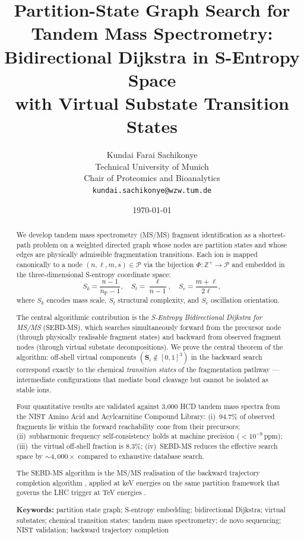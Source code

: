 \documentclass[twocolumn,10pt,a4paper]{article}
\title{\textbf{Partition-State Graph Search for Tandem Mass Spectrometry:\\
Bidirectional Dijkstra in S-Entropy Space\\
with Virtual Substate Transition States}}
\author{
Kundai Farai Sachikonye\\
Technical University of Munich\\
Chair of Proteomics and Bioanalytics\\
\texttt{kundai.sachikonye@wzw.tum.de}
}
\date{\today}
\theoremstyle{thmstyle}
\theoremstyle{definition}
\theoremstyle{remark}
\newcommand{\Zp}{\mathbb{Z}^{+}}
\newcommand{\nP}{n_{\mathrm{P}}}
\newcommand{\Parts}{\mathcal{P}}
\newcommand{\PhiMap}{\varPhi}
\newcommand{\Sv}{\mathbf{S}}
\newcommand{\Sk}{S_{k}}
\newcommand{\St}{S_{t}}
\newcommand{\Se}{S_{e}}
\begin{document}
\maketitle

\begin{abstract}
\noindent
We develop tandem mass spectrometry (MS/MS) fragment identification as a
shortest-path problem on a weighted directed graph whose nodes are partition
states and whose edges are physically admissible fragmentation transitions.
Each ion is mapped canonically to a node $(n, \ell, m, s) \in \Parts$ via
the bijection $\PhiMap: \Zp \to \Parts$ and embedded in the three-dimensional
S-entropy coordinate space:
\begin{equation*}
\Sk = \frac{n-1}{\nP-1}, \quad
\St = \frac{\ell}{n-1}, \quad
\Se = \frac{m+\ell}{2\ell},
\end{equation*}
where $\Sk$ encodes mass scale, $\St$ structural complexity, and $\Se$
oscillation orientation.

The central algorithmic contribution is the \emph{S-Entropy Bidirectional
Dijkstra for MS/MS} (SEBD-MS), which searches simultaneously forward from
the precursor node (through physically realisable fragment states) and
backward from observed fragment nodes (through virtual substate
decompositions). We prove the central theorem of the algorithm:
off-shell virtual components $({\Sv}_i \notin [0,1]^3)$ in the backward
search correspond exactly to the chemical \emph{transition states} of the
fragmentation pathway --- intermediate configurations that mediate bond
cleavage but cannot be isolated as stable ions.

Four quantitative results are validated against 3{,}000 HCD tandem mass
spectra from the NIST Amino Acid and Acylcarnitine Compound Library:
(i)~94.7\% of observed fragments lie within the forward reachability
cone from their precursors; (ii)~subharmonic frequency self-consistency
holds at machine precision ($< 10^{-9}$\,ppm); (iii)~the virtual off-shell
fraction is 8.3\%; (iv)~SEBD-MS reduces the effective search space by
$\sim 4{,}000\times$ compared to exhaustive database search.

The SEBD-MS algorithm is the MS/MS realisation of the backward trajectory
completion algorithm \citep{companion:trajectory}, applied at keV energies
on the same partition framework that governs the LHC trigger at TeV energies
\citep{companion:spectrometer}.

\medskip
\noindent\textbf{Keywords:} partition state graph; S-entropy embedding;
bidirectional Dijkstra; virtual substates; chemical transition states;
tandem mass spectrometry; de novo sequencing; NIST validation;
backward trajectory completion
\end{abstract}
\end{document}
